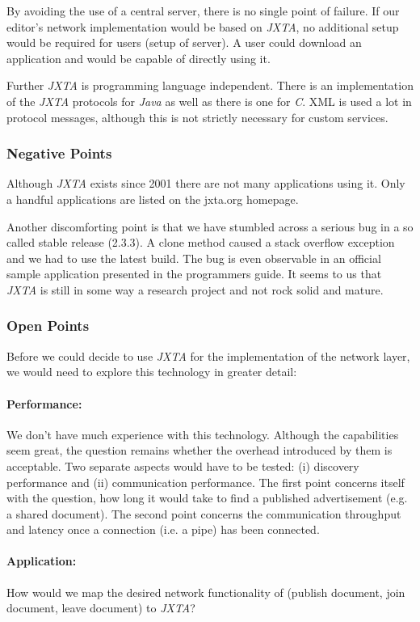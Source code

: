 By avoiding the use of a central server, there is no single point of failure. If our editor's network implementation would be based on \emph{JXTA}, no additional setup would be required for users (setup of server). A user could download an application and would be capable of directly using it.

Further \emph{JXTA} is programming language independent. There is an implementation of the \emph{JXTA} protocols for \emph{Java} as well as there is one for \emph{C}. XML is used a lot in protocol messages, although this is not strictly necessary for custom services.

\subsubsection{Negative Points}
Although \emph{JXTA} exists since 2001 there are not many applications using it. Only a handful applications are listed on the jxta.org homepage.

Another discomforting point is that we have stumbled across a serious bug in a so called stable release (2.3.3). A clone method caused a stack overflow exception and we had to use the latest build. The bug is even observable in an official sample application presented in the programmers guide. It seems to us that \emph{JXTA} is still in some way a research project and not rock solid and mature.

\subsubsection{Open Points}
Before we could decide to use \emph{JXTA} for the implementation of the network layer, we would need to explore this technology in greater detail:

\paragraph{Performance:} We don't have much experience with this technology. Although the capabilities seem great, the question remains whether the overhead introduced by them is acceptable. Two separate aspects would have to be tested: (i) discovery performance and (ii) communication performance. The first point concerns itself with the question, how long it would take to find a published advertisement (e.g. a shared document). The second point concerns the communication throughput and latency once a connection (i.e. a pipe) has been connected.

\paragraph{Application:} How would we map the desired network functionality of \ace (publish document, join document, leave document) to \emph{JXTA}?

